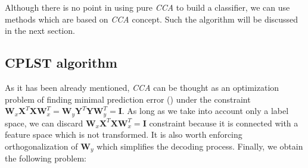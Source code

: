 Although there is no point in using pure \textit{CCA} to build a classifier, we can use methods which are based on \textit{CCA} concept. Such the algorithm will be discussed in the next section.

\subsection{CPLST algorithm}

As it has been already mentioned, \textit{CCA} can be thought as an optimization problem of finding minimal prediction error () under the constraint $\boldsymbol{W}_x\boldsymbol{X}^T\boldsymbol{X}\boldsymbol{W}_x^T=\boldsymbol{W}_y\boldsymbol{Y}^T\boldsymbol{Y}\boldsymbol{W}_y^T=\boldsymbol{I}$. As long as we take into account only a label space, we can discard $\boldsymbol{W}_x\boldsymbol{X}^T\boldsymbol{X}\boldsymbol{W}_x^T=\boldsymbol{I}$ constraint because it is connected with a feature space which is not transformed. It is also worth enforcing orthogonalization of $\boldsymbol{W}_y$  which simplifies the decoding process. Finally, we obtain the following problem:

